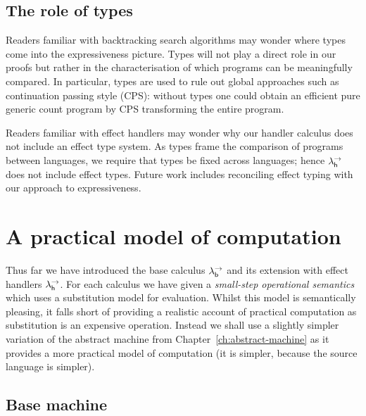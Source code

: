 \documentclass[12pt,phd,lfcs,twoside,openright,logo,leftchapter,normalheadings]{infthesis}
\theoremstyle{plain}
\theoremstyle{definition}
\begin{document}
\subsection{The role of types}

Readers familiar with backtracking search algorithms may wonder where
types come into the expressiveness picture.
%
Types will not play a direct role in our proofs but rather in the
characterisation of which programs can be meaningfully compared. In
particular, types are used to rule out global approaches such as
continuation passing style (CPS): without types one could obtain an
efficient pure generic count program by CPS transforming the entire
program.

Readers familiar with effect handlers may wonder why our handler
calculus does not include an effect type system.
%
As types frame the comparison of programs between languages, we
require that types be fixed across languages; hence $\lambda^\rightarrow_{\mathsf{h}}$ does not
include effect types.
%
Future work includes reconciling effect typing with our approach to
expressiveness.

\section{A practical model of computation}
\label{sec:abstract-machine-semantics}
Thus far we have introduced the base calculus $\lambda^\rightarrow_{\mathsf{b}}$ and its
extension with effect handlers $\lambda^\rightarrow_{\mathsf{h}}$.
%
For each calculus we have given a \emph{small-step operational
  semantics} which uses a substitution model for evaluation. Whilst
this model is semantically pleasing, it falls short of providing a
realistic account of practical computation as substitution is an
expensive operation. Instead we shall use a slightly simpler variation
of the abstract machine from Chapter~\ref{ch:abstract-machine} as it
provides a more practical model of computation (it is simpler, because
the source language is simpler).

\subsection{Base machine}
\label{sec:base-abstract-machine}

\newcommand{\Conf}{\dec{Conf}}
\newcommand{\EConf}{\dec{EConf}}
\newcommand{\MVal}{\dec{MVal}}
\end{document}
